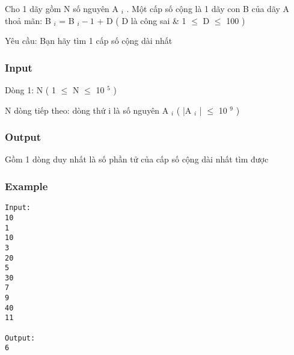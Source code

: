 



   Cho 1 dãy gồm N số nguyên  A   $_    i   $   . Một cấp số cộng là 1 dãy con B của dãy A thoả mãn: B   $_    i   $   =  B   $_    i-1   $   + D ( D là công sai \& 1  $\le$  D  $\le$  100 )  

   Yêu cầu: Bạn hãy tìm 1 cấp số cộng dài nhất  

\subsubsection{   Input  }

   Dòng 1: N ( 1  $\le$  N  $\le$  10   $^    5   $   )  

   N dòng tiếp theo: dòng thứ  i  là số nguyên  A   $_    i   $   ( |A   $_    i   $   |  $\le$  10   $^    9   $   )  

\subsubsection{   Output  }

   Gồm 1 dòng duy nhất là số phần tử của cấp số cộng dài nhất tìm được  

\subsubsection{   Example  }
\begin{verbatim}
Input:
10
1
10
3
20
5
30
7
9
40
11

Output:
6
\end{verbatim}
